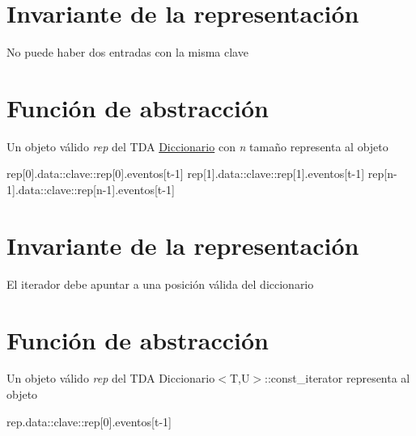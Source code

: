 \hypertarget{repConjunto_invConjunto}{}\section{Invariante de la representación}\label{repConjunto_invConjunto}
No puede haber dos entradas con la misma clave\hypertarget{repConjunto_faConjunto}{}\section{Función de abstracción}\label{repConjunto_faConjunto}
Un objeto válido {\itshape rep} del T\+DA \hyperlink{classDiccionario}{Diccionario} con {\itshape n} tamaño representa al objeto

rep\mbox{[}0\mbox{]}.data\+::clave\+::rep\mbox{[}0\mbox{]}.eventos\mbox{[}t-\/1\mbox{]} rep\mbox{[}1\mbox{]}.data\+::clave\+::rep\mbox{[}1\mbox{]}.eventos\mbox{[}t-\/1\mbox{]} rep\mbox{[}n-\/1\mbox{]}.data\+::clave\+::rep\mbox{[}n-\/1\mbox{]}.eventos\mbox{[}t-\/1\mbox{]}\hypertarget{repConjunto_invConjunto}{}\section{Invariante de la representación}\label{repConjunto_invConjunto}
El iterador debe apuntar a una posición válida del diccionario\hypertarget{repConjunto_faConjunto}{}\section{Función de abstracción}\label{repConjunto_faConjunto}
Un objeto válido {\itshape rep} del T\+DA Diccionario$<$\+T,\+U$>$\+::const\+\_\+iterator representa al objeto

rep.\+data\+::clave\+::rep\mbox{[}0\mbox{]}.eventos\mbox{[}t-\/1\mbox{]} 